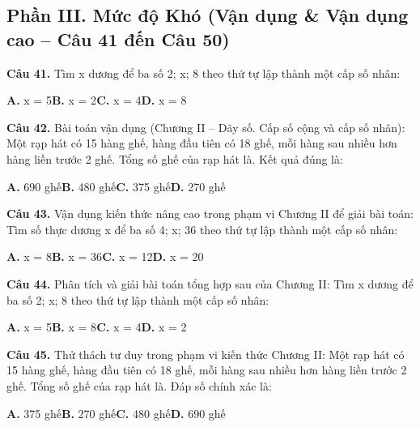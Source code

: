 \documentclass[11pt,a4paper]{article}
\begin{document}
\subsection*{\color{accent} Phần III. Mức độ Khó (Vận dụng \& Vận dụng cao -- Câu 41 đến Câu 50)}
\textbf{\color{primary} Câu 41.} Tìm x dương để ba số 2; x; 8 theo thứ tự lập thành một cấp số nhân:\par
\hspace*{1.5em}\textbf{A.} x = 5\quad\quad \textbf{B.} x = 2\quad\quad \textbf{C.} x = 4\quad\quad \textbf{D.} x = 8\par\vspace{2pt}
\textbf{\color{primary} Câu 42.} Bài toán vận dụng (Chương II – Dãy số. Cấp số cộng và cấp số nhân): Một rạp hát có 15 hàng ghế, hàng đầu tiên có 18 ghế, mỗi hàng sau nhiều hơn hàng liền trước 2 ghế. Tổng số ghế của rạp hát là. Kết quả đúng là:\par
\hspace*{1.5em}\textbf{A.} 690 ghế\quad\quad \textbf{B.} 480 ghế\quad\quad \textbf{C.} 375 ghế\quad\quad \textbf{D.} 270 ghế\par\vspace{2pt}
\textbf{\color{primary} Câu 43.} Vận dụng kiến thức nâng cao trong phạm vi Chương II để giải bài toán: Tìm số thực dương x để ba số 4; x; 36 theo thứ tự lập thành một cấp số nhân:\par
\hspace*{1.5em}\textbf{A.} x = 8\quad\quad \textbf{B.} x = 36\quad\quad \textbf{C.} x = 12\quad\quad \textbf{D.} x = 20\par\vspace{2pt}
\textbf{\color{primary} Câu 44.} Phân tích và giải bài toán tổng hợp sau của Chương II: Tìm x dương để ba số 2; x; 8 theo thứ tự lập thành một cấp số nhân:\par
\hspace*{1.5em}\textbf{A.} x = 5\quad\quad \textbf{B.} x = 8\quad\quad \textbf{C.} x = 4\quad\quad \textbf{D.} x = 2\par\vspace{2pt}
\textbf{\color{primary} Câu 45.} Thử thách tư duy trong phạm vi kiến thức Chương II: Một rạp hát có 15 hàng ghế, hàng đầu tiên có 18 ghế, mỗi hàng sau nhiều hơn hàng liền trước 2 ghế. Tổng số ghế của rạp hát là. Đáp số chính xác là:\par
\hspace*{1.5em}\textbf{A.} 375 ghế\quad\quad \textbf{B.} 270 ghế\quad\quad \textbf{C.} 480 ghế\quad\quad \textbf{D.} 690 ghế\par\vspace{2pt}
\end{document}
